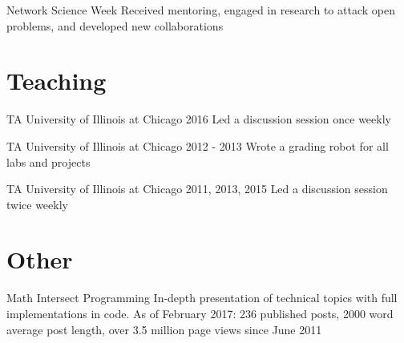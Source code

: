 \documentclass[11pt]{moderncv}
\begin{document}
  {Network Science Week}
  {}
  {Received mentoring, engaged in research to attack open problems, and developed new collaborations}
  {}
  {}

\section{Teaching}

  {TA}
  {University of Illinois at Chicago}
  {2016}
  {}
  {Led a discussion session once weekly}

  {TA}
  {University of Illinois at Chicago}
  {2012 - 2013}
  {}
  {Wrote a grading robot for all labs and projects}

  {TA}
  {University of Illinois at Chicago}
  {2011, 2013, 2015}
  {}
  {Led a discussion session twice weekly}

\section{Other}

  {Math Intersect Programming}
  {}
  {In-depth presentation of technical topics with full implementations in code. As of February 2017: 236 published posts, 2000 word average post length, over 3.5 million page views since June 2011}
  {}
  {}
\end{document}
